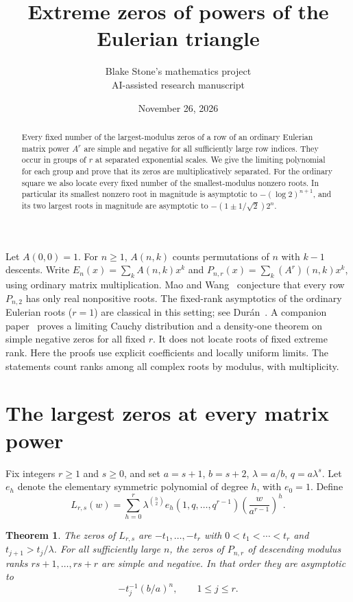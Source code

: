 \documentclass[11pt]{article}
\title{Extreme zeros of powers of the Eulerian triangle}
\author{Blake Stone's mathematics project\\\small AI-assisted research manuscript}
\date{November 26, 2026}
\newtheorem{theorem}{Theorem}
\begin{document}
\maketitle
\begin{abstract}
Every fixed number of the largest-modulus zeros of a row of an ordinary Eulerian matrix power $A^r$ are simple and negative for all sufficiently large row indices. They occur in groups of $r$ at separated exponential scales. We give the limiting polynomial for each group and prove that its zeros are multiplicatively separated. For the ordinary square we also locate every fixed number of the smallest-modulus nonzero roots. In particular its smallest nonzero root in magnitude is asymptotic to $-(\log 2)^{n+1}$, and its two largest roots in magnitude are asymptotic to $-(1\pm1/\sqrt2)2^n$.
\end{abstract}

Let $A(0,0)=1$. For $n\ge1$, $A(n,k)$ counts permutations of $n$ with $k-1$ descents. Write $E_n(x)=\sum_k A(n,k)x^k$ and $P_{n,r}(x)=\sum_k(A^r)(n,k)x^k$, using ordinary matrix multiplication. Mao and Wang~\cite[Conj.~4.1]{MW} conjecture that every row $P_{n,2}$ has only real nonpositive roots. The fixed-rank asymptotics of the ordinary Eulerian roots ($r=1$) are classical in this setting; see Dur\'an~\cite{Duran}. A companion paper~\cite{bulk} proves a limiting Cauchy distribution and a density-one theorem on simple negative zeros for all fixed $r$. It does not locate roots of fixed extreme rank. Here the proofs use explicit coefficients and locally uniform limits. The statements count ranks among all complex roots by modulus, with multiplicity.

\section{The largest zeros at every matrix power}
Fix integers $r\ge1$ and $s\ge0$, and set $a=s+1$, $b=s+2$, $\lambda=a/b$, $q=a\lambda^s$. Let $e_h$ denote the elementary symmetric polynomial of degree $h$, with $e_0=1$. Define
\begin{equation}\label{L}
 L_{r,s}(w)=\sum_{h=0}^r \lambda^{\binom h2} e_h(1,q,\ldots,q^{r-1})\left(\frac{w}{a^{r-1}}\right)^h .
\end{equation}
\begin{theorem}\label{largest}
The zeros of $L_{r,s}$ are $-t_1,\ldots,-t_r$ with $0<t_1<\cdots<t_r$ and $t_{j+1}>t_j/\lambda$. For all sufficiently large $n$, the zeros of $P_{n,r}$ of descending modulus ranks $rs+1,\ldots,rs+r$ are simple and negative. In that order they are asymptotic to
\[
 -t_j^{-1}(b/a)^n,\qquad 1\le j\le r .
\]
\end{theorem}
\end{document}
